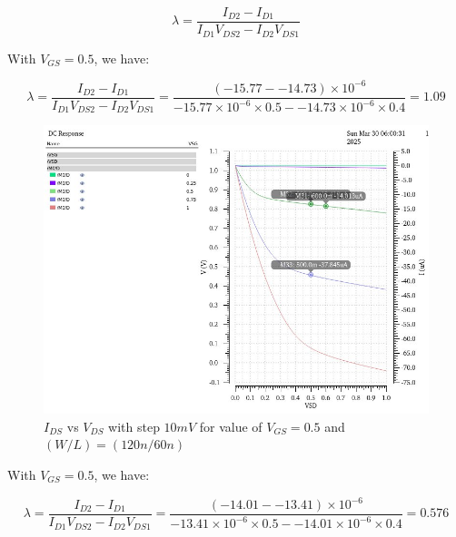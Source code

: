 \[ \lambda = \dfrac{I_{D2} - I_{D1}}{I_{D1} V_{DS2} - I_{D2} V_{DS1}} \]

With $V_{GS} = 0.5$, we have:

\[ \lambda = \dfrac{I_{D2} - I_{D1}}{I_{D1} V_{DS2} - I_{D2} V_{DS1}} = \dfrac{(-15.77 - -14.73)\times 10^{-6}}{-15.77\times 10^{-6}\times 0.5 - -14.73 \times 10^{-6} \times 0.4 }  = 1.09\]

%



\begin{figure}[H]
	\centering
	\includegraphics[width=.6\linewidth]{sections/pic/EX3_PMOS_lambda_(w_l)(120_90)(vgs_0_5).png}
	\caption{$I_{DS}$ vs $V_{DS}$ with step $10mV$  for value of $V_{GS} = 0.5$ and $(W/L) = (120n/60n)$}
	\label{f_EX3_PMOS_lambda_(w_l)(120_90)(vgs_0_5)}
\end{figure}

With $V_{GS} = 0.5$, we have:

\[ \lambda = \dfrac{I_{D2} - I_{D1}}{I_{D1} V_{DS2} - I_{D2} V_{DS1}} = \dfrac{(-14.01 - -13.41)\times 10^{-6}}{-13.41\times 10^{-6}\times 0.5 - -14.01 \times 10^{-6} \times 0.4 }  = 0.576 \]


